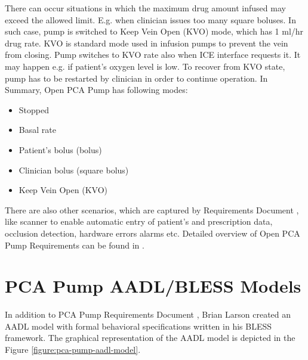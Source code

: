 There can occur situations in which the maximum drug amount infused may exceed the allowed limit. E.g. when clinician issues too many square boluses. In such case, pump is switched to Keep Vein Open (KVO) mode, which has 1 ml/hr drug rate. KVO is standard mode used in infusion pumps to prevent the vein from closing. Pump switches to KVO rate also when ICE interface requests it. It may happen e.g. if patient's oxygen level is low. To recover from KVO state, pump has to be restarted by clinician in order to continue operation. In Summary, Open PCA Pump has following modes:
\begin{itemize} \itemsep1pt \parskip0pt 
    \item Stopped
    \item Basal rate
    \item Patient's bolus (bolus)
    \item Clinician bolus (square bolus)
    \item Keep Vein Open (KVO)
\end{itemize}

There are also other scenarios, which are captured by Requirements Document \cite{PcaReq}, like scanner to enable automatic entry of patient's and prescription data, occlusion detection, hardware errors alarms etc. Detailed overview of Open PCA Pump Requirements can be found in \cite{PcaReq}.



\section{PCA Pump AADL/BLESS Models}
\label{pcapump:aadl-bless-models}

In addition to PCA Pump Requirements Document \cite{PcaReq}, Brian Larson created an AADL model with formal behavioral specifications written in his BLESS framework. The graphical representation of the AADL model is depicted in the Figure \ref{figure:pca-pump-aadl-model}. 

